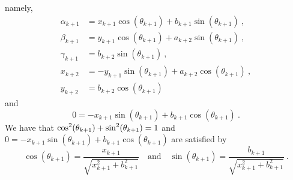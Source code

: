 namely,
\begin{equation}\label{C14L36}
\begin{split}
\alpha_{k+1} &= x_{k+1} \cos(\theta_{k+1}) + b_{k+1} \sin(\theta_{k+1}) \ , \\
\beta_{k+1} &= y_{k+1} \cos(\theta_{k+1}) + a_{k+2} \sin(\theta_{k+1}) \ , \\
\gamma_{k+1} &= b_{k+2} \sin(\theta_{k+1}) \ , \\
x_{k+2} &= - y_{k+1} \sin(\theta_{k+1}) + a_{k+2} \cos(\theta_{k+1}) \ , \\
y_{k+2} & = b_{k+2} \cos(\theta_{k+1})
\end{split}
\end{equation}
and
\[
0 = -x_{k+1} \sin(\theta_{k+1}) + b_{k+1} \cos(\theta_{k+1}) \ .
\]
We have that $\displaystyle \cos^2(\theta_{k+1})+\sin^2(\theta_{k+1}) = 1$ and
$0 = -x_{k+1} \sin(\theta_{k+1}) + b_{k+1} \cos(\theta_{k+1})$ are
satisfied by
\begin{equation} \label{C14L37}
\cos(\theta_{k+1}) = \frac{x_{k+1}}{\sqrt{x_{k+1}^2 + b_{k+1}^2}} \quad
\text{and} \quad
\sin(\theta_{k+1}) = \frac{b_{k+1}}{\sqrt{x_{k+1}^2 + b_{k+1}^2}} \ .
\end{equation}

